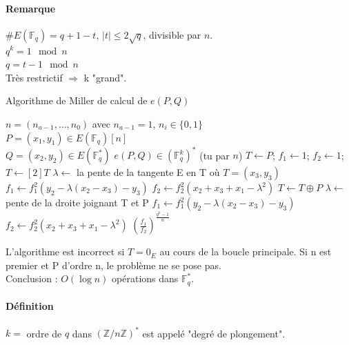 \documentclass[12pt,a4paper]{report}
\begin{document}
\paragraph{Remarque\\}
$\# E(\mathbb{F}_q) = q+1-t$, $ |t|\leqslant 2\sqrt{q}$, divisible par $n$.\\
$ q^k = 1 \mod n $\\
$q=t-1 \mod n $\\
Très restrictif $\Rightarrow $ k "grand".
 \begin{algorithm}[ht]
\caption{Algorithme de Miller de calcul de $e(P,Q)$}
\begin{algorithmic}[1]
\REQUIRE $n=(n_{a-1},\ldots,n_0)$ avec $n_{a-1} = 1$, $ n_i \in \{0,1\}$\\
$ P= (x_1,y_1) \in E(\mathbb{F}_q)[n] $\\
$ Q= (x_2,y_2) \in E(\mathbb{F}_q^*)$
\ENSURE $e(P,Q) \in (\mathbb{F}_q^k)^* $ (tu par $n$)
\STATE $T\leftarrow P$; $f_1 \leftarrow 1$; $f_2\leftarrow 1$;
\STATE $T \leftarrow [2]T$
\STATE $\lambda \leftarrow $ la pente de la tangente  E en T où $T=(x_3,y_3)$
\STATE $f_1 \leftarrow f_1^2(y_2-\lambda (x_2-x_3)-y_3)$
\STATE $f_2 \leftarrow f_2^2(x_2+x_3+x_1-\lambda^2)$
\STATE $T\leftarrow T\oplus P$
\STATE $ \lambda \leftarrow $ pente de la droite joignant T et P
\STATE $ f_1 \leftarrow f_1^2(y_2-\lambda (x_2-x_3)-y_3)$
\STATE $f_2 \leftarrow f_2^2(x_2+x_3+x_1-\lambda^2)$
\ENDIF
\ENDFOR
\RETURN $\displaystyle \left(\frac{f_1}{f_2}\right)^{\frac{q^k-1}{n}} $
\end{algorithmic}
\end{algorithm}
L'algorithme est incorrect si $T=0_E$ au cours de la boucle principale. Si n est premier et P d'ordre n, le problème ne se pose pas.\\
Conclusion : $O(\log n)$ opérations dans $\mathbb{F}_q^*$.
\paragraph{Définition\\}
$k=$ ordre de $q$ dans $(\mathbb{Z}/n\mathbb{Z})^*$ est appelé "degré de plongement".
\end{document}
